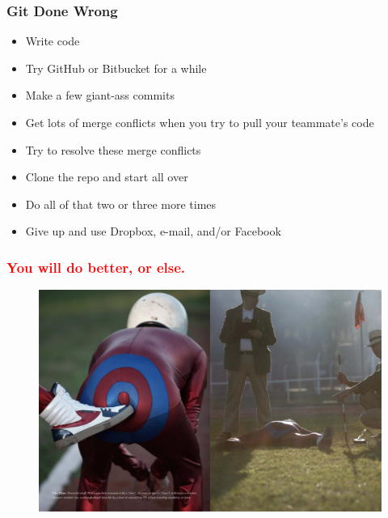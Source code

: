 \documentclass[glossy]{beamer}
\begin{document}
\begin{frame}[fragile=singleslide]
  \frametitle{Git Done Wrong}

  \begin{itemize}
    \item Write code
    \item Try GitHub or Bitbucket for a while
    \item Make a few giant-ass commits
    \item Get lots of merge conflicts when you try to pull your teammate's code
    \item Try to resolve these merge conflicts
    \item Clone the repo and start all over
    \item Do all of that two or three more times
    \item Give up and use Dropbox, e-mail, and/or Facebook
  \end{itemize}
\end{frame}

\begin{frame}[fragile=singleslide]
  \frametitle{\textcolor{red}{You will do better, or else.}}

  \begin{figure}
    \includegraphics[width=.9\columnwidth]{whoopass}
    \centering
  \end{figure}
\end{frame}
\end{document}
